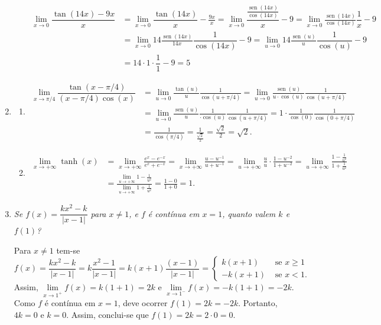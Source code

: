 \documentclass[12pt,a4paper]{article}
\newcommand*\sen{\operatorname{sen}}
\newcommand*\abs[1]{\left|#1\right|}
\begin{document}
\begin{enumerate}
\begin{enumerate}
\begin{align*}
  \lim\limits_{x\to 0} \dfrac{\tan(14x) - 9x}{x}
& = \lim\limits_{x\to 0} \dfrac{\tan(14x)}{x} - \frac{9x}{x}
  = \lim\limits_{x\to 0} \dfrac{\frac{\sen(14x)}{\cos(14x)}}{x} - 9
  = \lim\limits_{x\to 0} \frac{\sen(14x)}{\cos(14x)} \dfrac{1}{x} - 9 \\
& = \lim\limits_{x\to 0} 14 \frac{\sen(14x)}{14 x} \dfrac{1}{\cos(14x)} - 9
  = \lim\limits_{u\to 0} 14 \frac{\sen(u)}{u} \dfrac{1}{\cos(u)} - 9 \\
& = 14 \cdot 1 \cdot \dfrac{1}{1} - 9
  = 5
\end{align*}

\end{enumerate}

\item
\begin{enumerate}
\item \begin{align*}
    \lim\limits_{x\to \pi/4} \dfrac{\tan(x-\pi/4)}{(x-\pi/4)\cos(x)}
& = \lim\limits_{u\to 0} \frac{\tan(u)}{u}\frac{1}{\cos(u+\pi/4)}
  = \lim\limits_{u\to 0} \frac{\sen(u)}{u \cdot \cos(u)}\frac{1}{\cos(u+\pi/4)} \\
& = \lim\limits_{u\to 0} \frac{\sen(u)}{u}\frac{1}{\cdot \cos(u)}\frac{1}{\cos(u+\pi/4)}
  = 1 \cdot \frac{1}{ \cos(0) } \frac{1}{\cos(0 + \pi/4)} \\
& = \frac{1}{\cos(\pi/4)}
  = \frac{1}{ \frac{\sqrt{2}}{2} }
  = \frac{\sqrt{2}}{2}
  = \sqrt{2}.
\end{align*}

\item \begin{align*}
\lim\limits_{x\to +\infty} \tanh(x)
& = \lim\limits_{x\to +\infty} \frac{e^x-e^{-x}}{e^x+e^{-x}}
  = \lim\limits_{x\to +\infty} \frac{u-u^{-1}}{u+u^{-1}}
  = \lim\limits_{u\to +\infty} \frac{u}{u} \cdot \frac{1-u^{-2}}{1+u^{-2}}
  = \lim\limits_{u\to +\infty} \frac{1-\frac{1}{u^2}}{1+\frac{1}{u^2}} \\
& = \frac{\lim\limits_{u\to +\infty} 1-\frac{1}{u^2}}{\lim\limits_{u\to +\infty} 1+\frac{1}{u^2}}
  = \frac{1 - 0}{1 + 0} = 1.
\end{align*}

\end{enumerate}

\item \textit{Se $f(x) = \dfrac{k x^2 - k}{\abs{x-1}}$ para $x \neq 1$, e $f$ é contínua em $x=1$, quanto valem $k$ e $f(1)$?}

Para $x \neq 1$ tem-se
\[
f(x) = \frac{k x^2 - k}{\abs{x-1}}
     = k \frac{x^2 - 1}{\abs{x-1}}
     = k(x+1) \frac{(x-1)}{\abs{x-1}}
= \begin{cases}
k (x+1) & \text{ se } x \geq 1 \\
-k (x+1) & \text{ se } x < 1.
\end{cases}
\]
Assim, $\lim\limits_{x \to 1^+} f(x) = k (1+1) = 2k$ e $\lim\limits_{x \to 1^-} f(x) = -k (1+1) = -2k$. Como $f$ é contínua em $x=1$, deve ocorrer $f(1) = 2k = -2k$. Portanto, $4k=0$ e $k=0$. Assim, conclui-se que $f(1) = 2k = 2\cdot 0 = 0$.

\end{enumerate}
\end{document}
